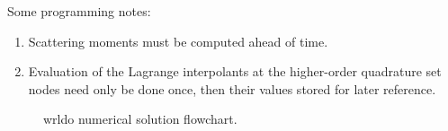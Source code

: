 Some programming notes:
\begin{enumerate}
  \item Scattering moments must be computed ahead of time.
  \item Evaluation of the Lagrange interpolants at the higher-order quadrature set nodes need only be done once, then their values stored for later reference.
\end{enumerate}

\begin{figure}
  \centering
  
  \caption{\Gls{wrldo} numerical solution flowchart.}
  \label{fig:wrldo-flowchart}
\end{figure}